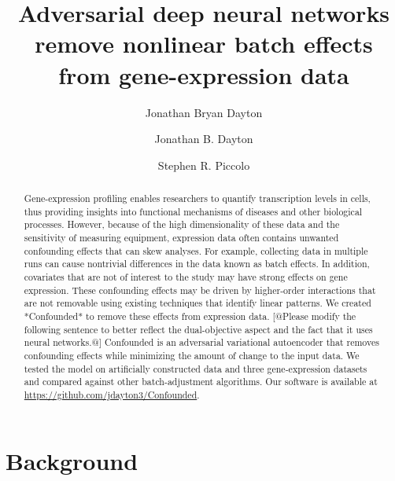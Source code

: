 \documentclass[11pt]{article}
\begin{document}
\title{Adversarial deep neural networks remove nonlinear batch effects from gene-expression data}
\author{Jonathan Bryan Dayton}
\author[1]{Jonathan B. Dayton}
\author[1]{Stephen R. Piccolo}

\maketitle

\begin{abstract}
	Gene-expression profiling enables researchers to quantify transcription levels in cells, thus providing insights into functional mechanisms of diseases and other biological processes.
	However, because of the high dimensionality of these data and the sensitivity of measuring equipment, expression data often contains unwanted confounding effects that can skew analyses.
	For example, collecting data in multiple runs can cause nontrivial differences in the data known as batch effects.
	In addition, covariates that are not of interest to the study may have strong effects on gene expression.
	These confounding effects may be driven by higher-order interactions that are not removable using existing techniques that identify linear patterns.
	We created *Confounded* to remove these effects from expression data.
	[@Please modify the following sentence to better reflect the dual-objective aspect and the fact that it uses neural networks.@]
	Confounded is an adversarial variational autoencoder that removes confounding effects while minimizing the amount of change to the input data.
	We tested the model on artificially constructed data and three gene-expression datasets and compared against other batch-adjustment algorithms.
	Our software is available at \url{https://github.com/jdayton3/Confounded}.
\end{abstract}

\doublespacing
\section{Background} \label{sec:background}
\end{document}
